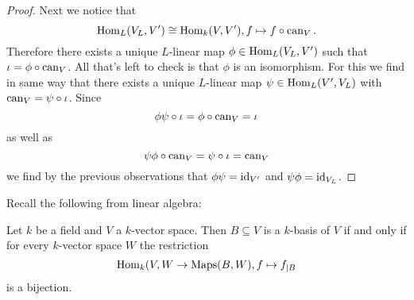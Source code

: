 \begin{proof}
  Next we notice that
  \[
          \operatorname{Hom}_L(V_L, V')
    \cong \operatorname{Hom}_k(V, V'),
            f
    \mapsto f \circ \operatorname{can}_V.
  \]
  Therefore there exists a unique $L$-linear map $\phi \in \operatorname{Hom}_L(V_L, V')$ such that \mbox{$\iota = \phi \circ \operatorname{can}_V$}.
  All that’s left to check is that $\phi$ is an isomorphism.
  For this we find in same way that there exists a unique $L$-linear map $\psi \in \operatorname{Hom}_L(V', V_L)$ with $\operatorname{can}_V = \psi \circ \iota$.
  Since
  \[
      \phi \psi \circ \iota
    = \phi \circ \operatorname{can}_V
    = \iota
  \]
  as well as
  \[
      \psi \phi \circ \operatorname{can}_V
    = \psi \circ \iota
    = \operatorname{can}_V
  \]
  we find by the previous observations that $\phi \psi = \operatorname{id}_{V'}$ and $\psi \phi = \operatorname{id}_{V_L}$.
\end{proof}


Recall the following from linear algebra:


\begin{rec}
  Let $k$ be a field and $V$ a $k$-vector space.
  Then $B \subseteq V$ is a $k$-basis of $V$ if and only if for every $k$-vector space $W$ the restriction
  \[
        \operatorname{Hom}_k(V,W
    \to \operatorname{Maps}(B,W),
            f
    \mapsto f_{|B}
  \]
  is a bijection.
\end{rec}


